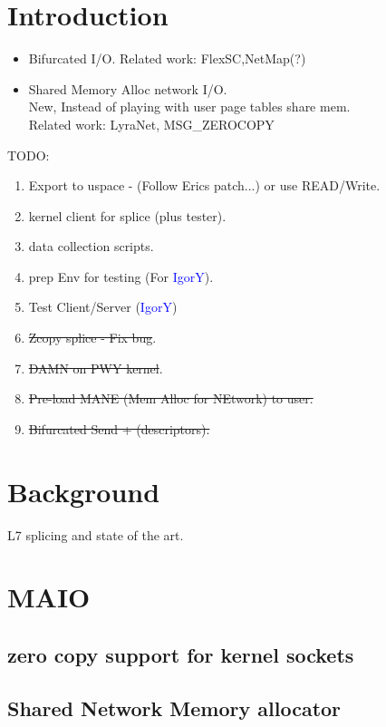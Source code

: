 \documentclass[newfonts=false,format=sigconf,9pt,letterpaper]{acmart}
\newcommand{\oursys}{MAIO\xspace}
\newcommand{\igor}{\textcolor{blue}{IgorY}\xspace}
\begin{document}
\maketitle
\sloppypar

\section{Introduction}
\begin{itemize}
    \item Bifurcated I/O. Related work: FlexSC,NetMap(?)
    \item Shared Memory Alloc network I/O.\\ New, Instead of playing with user page tables share mem.\\ Related work: LyraNet, MSG\_ZEROCOPY\cite{desendmsg}
\end{itemize}
\smallskip
TODO:
\begin{enumerate}
    \item Export to uspace - (Follow Erics patch...) or use READ/Write.
    \item kernel client for splice (plus tester).
    \item data collection scripts.
    \item prep Env for testing (For \igor).
    \item Test Client/Server (\igor)
    \item \st{Zcopy splice - Fix bug}.
    \item \st{DAMN on PWY kernel}.
    \item \st{Pre-load MANE (Mem Alloc for NEtwork) to user.} 
    \item \st{Bifurcated Send + (descriptors).}
\end{enumerate}
\smallskip


\section{Background}
L7 splicing and state of the art.
\section{\oursys}
\subsection{zero copy support for kernel sockets}
\subsection{Shared Network Memory allocator}
\end{document}
